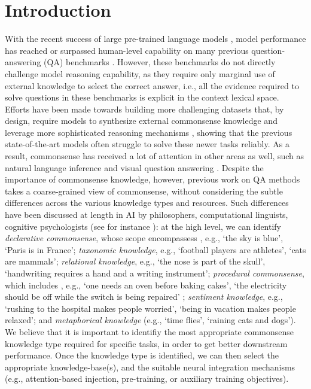 \documentclass[11pt,a4paper]{article}
\begin{document}
\section{Introduction}
With the recent success of large pre-trained language models \cite{devlin-etal-2019-bert,radford2019language,yang2019xlnet,DBLP:journals/corr/abs-1907-11692}, model performance has reached or surpassed human-level capability on many previous question-answering (QA) benchmarks \cite{NIPS2015_5945,rajpurkar-etal-2016-squad,DBLP:journals/corr/LaiXLYH17}. However, these benchmarks do not directly challenge model reasoning capability, as they require only marginal use of external knowledge to select the correct answer, i.e., all the evidence required to solve questions in these benchmarks is explicit in the context lexical space. Efforts have been made towards building more challenging datasets that, by design, require models to synthesize external commonsense knowledge and leverage more sophisticated reasoning mechanisms \cite{DBLP:journals/corr/abs-1810-12885,ostermann-etal-2018-semeval}, showing that the previous state-of-the-art models often struggle to solve these newer tasks reliably. As a result, commonsense has received a lot of attention in other areas as well, such as natural language inference \cite{zellers-etal-2018-swag,zellers-etal-2019-hellaswag} and visual question answering \cite{DBLP:journals/corr/abs-1811-10830}. 
Despite the importance of commonsense knowledge, however, previous work on QA methods takes a coarse-grained view of commonsense, without considering the subtle differences across the various knowledge types and resources. Such differences have been discussed at length in AI by philosophers, computational linguists, cognitive psychologists (see for instance \cite{davis2014representations}): at the high level, we can identify \textit{declarative commonsense}, whose scope encompassess , e.g., `the sky is blue', `Paris is in France'; \textit{taxonomic knowledge}, e.g., `football players are athletes', `cats are mammals'; \textit{relational knowledge}, e.g., `the nose is part of the skull', `handwriting requires a hand and a writing instrument'; \textit{procedural commonsense}, which includes , e.g., `one needs an oven before baking cakes', `the electricity should be off while the switch is being repaired' \cite{hobbs1987commonsense}; \textit{sentiment knowledge}, e.g., `rushing to the hospital makes people worried', `being in vacation makes people relaxed'; and \textit{metaphorical knowledge} (e.g., `time flies', `raining cats and dogs'). We believe that it is important to identifiy the most appropriate commonsense knowledge type required for specific tasks, in order to get better downstream performance. Once the knowledge type is identified, we can then select the appropriate knowledge-base(s), and the suitable neural integration mechanisms (e.g., attention-based injection, pre-training, or auxiliary training objectives). 
\end{document}
